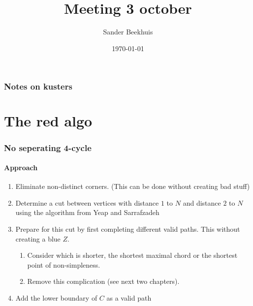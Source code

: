 \documentclass[a4paper]{article}
\title{Meeting 3 october}
\author{Sander Beekhuis}
\date{\today} %
\theoremstyle{definition}
\begin{document}
\maketitle

\section{Notes on kusters}


\newpage
\part{The red algo}
\section{No seperating 4-cycle}
\subsection{Approach}

\begin{enumerate}
\item Eliminate non-distinct corners. (This can be done without creating bad stuff)

\item Determine a cut between vertices with distance $1$ to $N$ and distance $2$ to $N$ using the algorithm from Yeap and Sarrafzadeh \cite{Yeap1995}

\item Prepare for this cut by first completing different valid paths. This without creating a blue $Z$.
\begin{enumerate}
\item Consider which is shorter, the shortest maximal chord or the shortest point of non-simpleness.
\item Remove this complication (see next two chapters).
\end{enumerate}

\item Add the lower boundary of $C$ as a valid path 
\end{enumerate}
\end{document}
